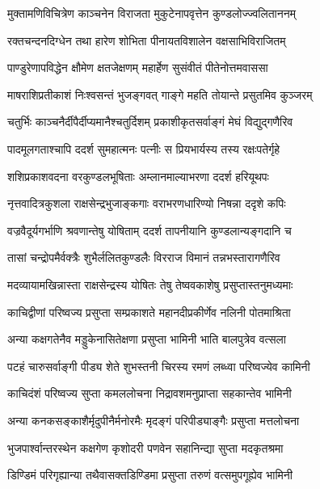 \twolineshloka
{मुक्तामणिविचित्रेण काञ्चनेन विराजता}
{मुकुटेनापवृत्तेन कुण्डलोज्ज्वलिताननम्} %

\twolineshloka
{रक्तचन्दनदिग्धेन तथा हारेण शोभिता}
{पीनायतविशालेन वक्षसाभिविराजितम्} %

\twolineshloka
{पाण्डुरेणापविद्धेन क्षौमेण क्षतजेक्षणम्}
{महार्हेण सुसंवीतं पीतेनोत्तमवाससा} %

\twolineshloka
{माषराशिप्रतीकाशं निःश्वसन्तं भुजङ्गवत्}
{गाङ्गे महति तोयान्ते प्रसुतमिव कुञ्जरम्} %

\twolineshloka
{चतुर्भिः काञ्चनैर्दीपैर्दीप्यमानैश्चतुर्दिशम्}
{प्रकाशीकृतसर्वाङ्गं मेघं विद्युद्गणैरिव} %

\twolineshloka
{पादमूलगताश्चापि ददर्श सुमहात्मनः}
{पत्नीः स प्रियभार्यस्य तस्य रक्षःपतेर्गृहे} %

\twolineshloka
{शशिप्रकाशवदना वरकुण्डलभूषिताः}
{अम्लानमाल्याभरणा ददर्श हरियूथपः} %

\twolineshloka
{नृत्तवादित्रकुशला राक्षसेन्द्रभुजाङ्कगाः}
{वराभरणधारिण्यो निषन्ना ददृशे कपिः} %

\twolineshloka
{वज्रवैदूर्यगर्भाणि श्रवणान्तेषु योषिताम्}
{ददर्श तापनीयानि कुण्डलान्यङ्गदानि च} %

\twolineshloka
{तासां चन्द्रोपमैर्वक्त्रैः शुभैर्ललितकुण्डलैः}
{विरराज विमानं तन्नभस्तारागणैरिव} %

\twolineshloka
{मदव्यायामखिन्नास्ता राक्षसेन्द्रस्य योषितः}
{तेषु तेष्ववकाशेषु प्रसुप्तास्तनुमध्यमाः} %

\twolineshloka
{काचिद्वीणां परिष्वज्य प्रसुप्ता सम्प्रकाशते}
{महानदीप्रकीर्णेव नलिनी पोतमाश्रिता} %

\twolineshloka
{अन्या कक्षगतेनैव मड्डुकेनासितेक्षणा}
{प्रसुप्ता भामिनी भाति बालपुत्रेव वत्सला} %

\twolineshloka
{पटहं चारुसर्वाङ्गी पीड्य शेते शुभस्तनी}
{चिरस्य रमणं लब्ध्वा परिष्वज्येव कामिनी} %

\twolineshloka
{काचिदंशं परिष्वज्य सुप्ता कमललोचना}
{निद्रावशमनुप्राप्ता सहकान्तेव भामिनी} %

\twolineshloka
{अन्या कनकसङ्काशैर्मृदुपीनैर्मनोरमैः}
{मृदङ्गं परिपीड्याङ्गैः प्रसुप्ता मत्तलोचना} %

\twolineshloka
{भुजपार्श्वान्तरस्थेन कक्षगेण कृशोदरी}
{पणवेन सहानिन्द्या सुप्ता मदकृतश्रमा} %

\twolineshloka
{डिण्डिमं परिगृह्यान्या तथैवासक्तडिण्डिमा}
{प्रसुप्ता तरुणं वत्समुपगूह्येव भामिनी} %


